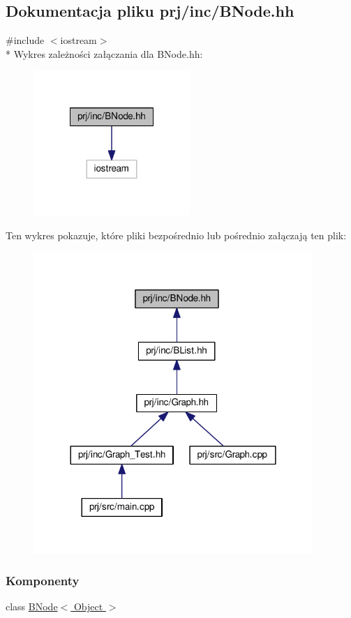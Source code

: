 \hypertarget{_b_node_8hh}{\subsection{Dokumentacja pliku prj/inc/\-B\-Node.hh}
\label{_b_node_8hh}
}
{\ttfamily \#include $<$iostream$>$}\\*
Wykres zależności załączania dla B\-Node.\-hh\-:
\nopagebreak
\begin{figure}[H]
\begin{center}
\leavevmode
\includegraphics[width=168pt]{_b_node_8hh__incl}
\end{center}
\end{figure}
Ten wykres pokazuje, które pliki bezpośrednio lub pośrednio załączają ten plik\-:
\nopagebreak
\begin{figure}[H]
\begin{center}
\leavevmode
\includegraphics[width=300pt]{_b_node_8hh__dep__incl}
\end{center}
\end{figure}
\subsubsection*{Komponenty}
\begin{DoxyCompactItemize}
\item 
class \hyperlink{class_b_node}{B\-Node$<$ Object $>$}
\end{DoxyCompactItemize}
